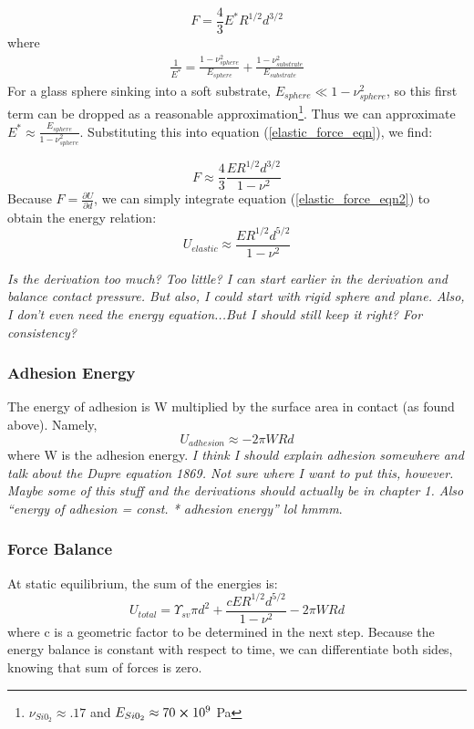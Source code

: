 \begin{equation}
	F = \frac{4}{3}E^*R^{1/2}d^{3/2}
	\label{elastic_force_eqn}
\end{equation} 
where 
\begin{align*}
 \frac{1}{E^*} = \frac{1-\nu_{sphere}^2}{E_{sphere}} + \frac{1-\nu_{substrate}^2}{E_{substrate}} 
\end{align*}
For a glass sphere sinking into a soft substrate, $ E_{sphere} \ll 1-\nu_{sphere}^2 $, so this first term can be dropped as a reasonable approximation\footnote{$\nu_{Si0_2} \approx .17 $ and $ E_{Si0_2} \approx 70 \cross 10^9 $ Pa}. Thus we can approximate $ E^* \approx \frac{E_{sphere}}{1-\nu_{sphere}^2} $. Substituting this into equation (\ref{elastic_force_eqn}), we find:

\begin{equation}
F \approx \frac{4}{3}\frac{ER^{1/2}d^{3/2}}{1-\nu^2}
\label{elastic_force_eqn2}
\end{equation}
Because $F = \frac{\partial U}{\partial d}$, we can simply integrate equation (\ref{elastic_force_eqn2}) to obtain the energy relation:
\begin{equation}
\label{elastic_energy}
U_{elastic} \approx  \frac{ER^{1/2}d^{5/2}}{1-\nu^2}
\end{equation}

\emph{Is the derivation too much? Too little? I can start earlier in the derivation and balance contact pressure. But also, I could start with rigid sphere and plane. Also, I don't even need the energy equation...But I should still keep it right? For consistency?} 



\subsubsection{Adhesion Energy}
The energy of adhesion is W multiplied by the surface area in contact (as found above). Namely,
\begin{equation}
\label{W_energy}
U_{adhesion} \approx -2\pi W R d 
\end{equation}
where W is the adhesion energy. \emph{I think I should explain adhesion somewhere and talk about the Dupre equation 1869. Not sure where I want to put this, however. Maybe some of this stuff and the derivations should actually be in chapter 1. Also ``energy of adhesion = const. * adhesion energy'' lol hmmm}. 

\subsubsection{Force Balance}
At static equilibrium, the sum of the energies is:
\[U_{total} = \Upsilon_{sv} \pi d^2 + \frac{cER^{1/2}d^{5/2}}{1-\nu^2} - 2\pi W R d\] 
where c is a geometric factor to be determined in the next step. Because the energy balance is constant with respect to time, we can differentiate both sides, knowing that sum of forces is zero.

